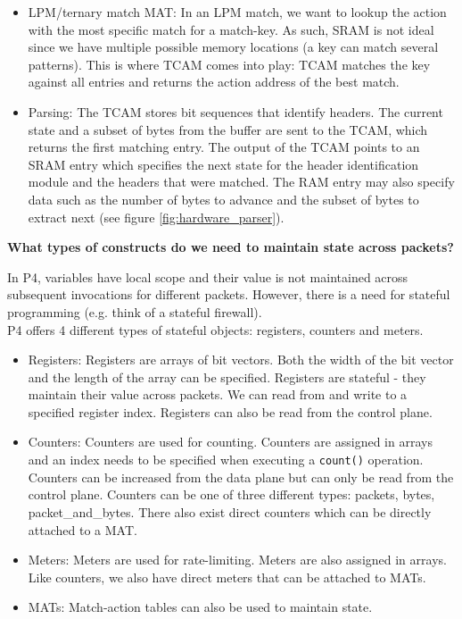 \documentclass[11pt,oneside,a4paper]{article}
\begin{document}
\begin{itemize}
	\begin{itemize}
	\item LPM/ternary match MAT: In an LPM match, we want to lookup the action with the most specific match for a match-key. As such, SRAM is not ideal since we have multiple possible memory locations (a key can match several patterns). This is where TCAM comes into play: TCAM matches the key against all entries and returns the action address of the best match.
	\item Parsing: The TCAM stores bit sequences that identify headers. The current state and a subset of bytes from the buffer are sent to the TCAM, which returns the first matching entry. The output of the TCAM points to an SRAM entry which specifies
	the next state for the header identification module and the headers that were matched. The RAM entry may also specify data such as the number of bytes to advance and the subset of bytes to extract next (see figure \ref{fig:hardware_parser}).
	\end{itemize}	
\end{itemize}
\vspace{-\topsep}

\noindent \textbf{What types of constructs do we need to maintain state across packets?}

In P4, variables have local scope and their value is not maintained across subsequent invocations for different packets. However, there is a need for stateful programming (e.g. think of a stateful firewall).\\
P4 offers 4 different types of stateful objects: registers, counters and meters.

\vspace{-\topsep}
\begin{itemize}
	\setlength{\itemsep}{0pt}
	\setlength{\parskip}{0pt}
	\item Registers: Registers are arrays of bit vectors. Both the width of the bit vector and the length of the array can be specified. Registers are stateful - they maintain their value across packets. We can read from and write to a specified register index. Registers can also be read from the control plane.
	
	\item Counters: Counters are used for counting. Counters are assigned in arrays and an index needs to be specified when executing a \texttt{count()} operation. Counters can be increased from the data plane but can only be read from the control plane. Counters can be one of three different types: packets, bytes, packet\_and\_bytes. There also exist direct counters which can be directly attached to a MAT.
	
	\item Meters: Meters are used for rate-limiting. Meters are also assigned in arrays. Like counters, we also have direct meters that can be attached to MATs.
	\item MATs: Match-action tables can also be used to maintain state.\\
\end{itemize}
\vspace{-\topsep}
\end{document}
